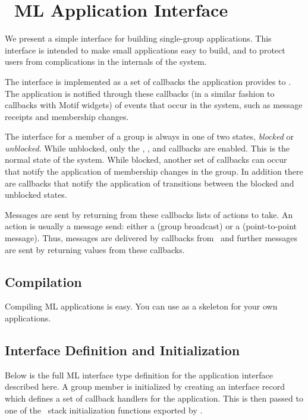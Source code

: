 %
%
%
\section{\ensemble\ ML Application Interface}
\label{section:applintf}

We present a simple interface for building single-group applications.  This
interface is intended to make small applications easy to build, and to protect
users from complications in the internals of the system.

The interface is implemented as a set of callbacks the application provides to
\ensemble.  The application is notified through these callbacks (in a similar
fashion to callbacks with Motif widgets) of events that occur in the system,
such as message receipts and membership changes.

The interface for a member of a group is always in one of two states,
\emph{blocked} or \emph{unblocked}.  While unblocked, only the
, , and  callbacks are
enabled.  This is the normal state of the system.  While blocked, another set
of callbacks can occur that notify the application of membership changes in the
group.  In addition there are callbacks that notify the application of
transitions between the blocked and unblocked states.

Messages are sent by returning from these callbacks lists of actions to
take.  An action is usually a message send: either a  (group
broadcast) or a  (point-to-point message).  Thus, messages are
delivered by callbacks from \ensemble\ and further messages are sent by
returning values from these callbacks.

\subsection{Compilation}
Compiling ML applications is easy.  You can use  as a
skeleton for your own applications.

\subsection{Interface Definition and Initialization}
Below is the full ML interface type definition for the application
interface described here.  A group member is initialized by creating an
interface record which defines a set of callback handlers for the
application.  This is then passed to one of the \ensemble\ stack initialization
functions exported by .

